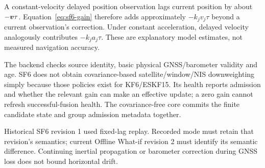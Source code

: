 A constant-velocity delayed position observation lags current position by about $-\boldsymbol{v}\tau$. Equation~\eqref{eq:sf6-gain} therefore adds approximately $-k_jv_j\tau$ beyond a current observation's correction. Under constant acceleration, delayed velocity analogously contributes $-k_ja_j\tau$. These are explanatory model estimates, not measured navigation accuracy.

The backend checks source identity, basic physical GNSS/barometer validity and age. SF6 does not obtain covariance-based satellite/window/NIS downweighting simply because those policies exist for KF6/ESKF15. Its health reports admission and whether the relevant gain can make an effective update; a zero gain cannot refresh successful-fusion health. The covariance-free core commits the finite candidate state and group admission metadata together.

Historical SF6 revision 1 used fixed-lag replay. Recorded mode must retain that revision's semantics; current Offline What-if revision 2 must identify its semantic difference. Continuing inertial propagation or barometer correction during GNSS loss does not bound horizontal drift.

